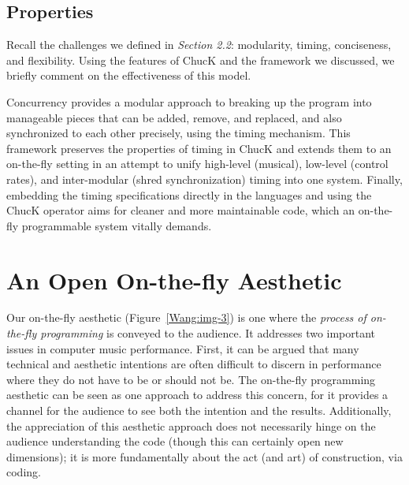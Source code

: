 \subsection{Properties}

Recall the challenges we defined in \textit{Section 2.2}: modularity, timing,
conciseness, and flexibility.  Using the features of ChucK and the framework we
discussed, we briefly comment on the effectiveness of this model.

Concurrency provides a modular approach to breaking up the program into
manageable pieces that can be added, remove, and replaced, and also synchronized
to each other precisely, using the timing mechanism.  This framework preserves
the properties of timing in ChucK and extends them to an on-the-fly setting in an
attempt to unify high-level (musical), low-level (control rates), and
inter-modular (shred synchronization) timing into one system.  Finally, embedding
the timing specifications directly in the languages and using the ChucK operator
aims for cleaner and more maintainable code, which an on-the-fly programmable
system vitally demands.

\section{An Open On-the-fly Aesthetic}

Our on-the-fly aesthetic (Figure~\ref{Wang:img-3}) is one where the \textit{process of
on-the-fly programming} is conveyed to the audience.  It addresses two important
issues in computer music performance.  First, it can be argued that many
technical and aesthetic intentions are often difficult to discern in performance
where they do not have to be or should not be.   The on-the-fly programming
aesthetic can be seen as one approach to address this concern, for it provides a
channel for the audience to see both the intention and the results. 
Additionally, the appreciation of this aesthetic approach does not necessarily
hinge on the audience understanding the code (though this can certainly open new
dimensions); it is more fundamentally about the act (and art) of construction,
via coding.


